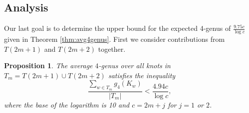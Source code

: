 \documentclass[12pt]{amsart}
\newtheorem{proposition}[theorem]{Proposition}
\theoremstyle{definition}
\theoremstyle{remark}
\numberwithin{equation}{section}
\begin{document}
\subsection{Analysis}  
\label{subsec:analysis}  Our last goal is to determine the upper bound for the expected 4-genus of $\frac{9.75c}{\log c}$ given in Theorem \ref{thm:avg4genus}.  First we consider contributions from $T(2m+1)$ and $T(2m+2)$ together.



\begin{proposition}
    \label{prop:avg4genus2}
    The average $4$-genus over all knots in $T_m=T(2m+1)\cup T(2m+2)$ satisfies the inequality
    \[\frac{\sum_{w\in T_m} g_4(K_w)}{|T_m|} < \frac{4.94c}{\log c},\]
    where the base of the logarithm is 10 and $c=2m+j$ for $j=1$ or $2$.
\end{proposition}
\end{document}
